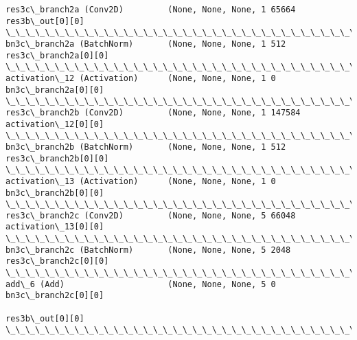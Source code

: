\documentclass[11pt]{article}
\begin{document}
\begin{Verbatim}[commandchars=\\\{\}]
res3c\_branch2a (Conv2D)         (None, None, None, 1 65664       res3b\_out[0][0]                  
\_\_\_\_\_\_\_\_\_\_\_\_\_\_\_\_\_\_\_\_\_\_\_\_\_\_\_\_\_\_\_\_\_\_\_\_\_\_\_\_\_\_\_\_\_\_\_\_\_\_\_\_\_\_\_\_\_\_\_\_\_\_\_\_\_\_\_\_\_\_\_\_\_\_\_\_\_\_\_\_\_\_\_\_\_\_\_\_\_\_\_\_\_\_\_\_\_\_
bn3c\_branch2a (BatchNorm)       (None, None, None, 1 512         res3c\_branch2a[0][0]             
\_\_\_\_\_\_\_\_\_\_\_\_\_\_\_\_\_\_\_\_\_\_\_\_\_\_\_\_\_\_\_\_\_\_\_\_\_\_\_\_\_\_\_\_\_\_\_\_\_\_\_\_\_\_\_\_\_\_\_\_\_\_\_\_\_\_\_\_\_\_\_\_\_\_\_\_\_\_\_\_\_\_\_\_\_\_\_\_\_\_\_\_\_\_\_\_\_\_
activation\_12 (Activation)      (None, None, None, 1 0           bn3c\_branch2a[0][0]              
\_\_\_\_\_\_\_\_\_\_\_\_\_\_\_\_\_\_\_\_\_\_\_\_\_\_\_\_\_\_\_\_\_\_\_\_\_\_\_\_\_\_\_\_\_\_\_\_\_\_\_\_\_\_\_\_\_\_\_\_\_\_\_\_\_\_\_\_\_\_\_\_\_\_\_\_\_\_\_\_\_\_\_\_\_\_\_\_\_\_\_\_\_\_\_\_\_\_
res3c\_branch2b (Conv2D)         (None, None, None, 1 147584      activation\_12[0][0]              
\_\_\_\_\_\_\_\_\_\_\_\_\_\_\_\_\_\_\_\_\_\_\_\_\_\_\_\_\_\_\_\_\_\_\_\_\_\_\_\_\_\_\_\_\_\_\_\_\_\_\_\_\_\_\_\_\_\_\_\_\_\_\_\_\_\_\_\_\_\_\_\_\_\_\_\_\_\_\_\_\_\_\_\_\_\_\_\_\_\_\_\_\_\_\_\_\_\_
bn3c\_branch2b (BatchNorm)       (None, None, None, 1 512         res3c\_branch2b[0][0]             
\_\_\_\_\_\_\_\_\_\_\_\_\_\_\_\_\_\_\_\_\_\_\_\_\_\_\_\_\_\_\_\_\_\_\_\_\_\_\_\_\_\_\_\_\_\_\_\_\_\_\_\_\_\_\_\_\_\_\_\_\_\_\_\_\_\_\_\_\_\_\_\_\_\_\_\_\_\_\_\_\_\_\_\_\_\_\_\_\_\_\_\_\_\_\_\_\_\_
activation\_13 (Activation)      (None, None, None, 1 0           bn3c\_branch2b[0][0]              
\_\_\_\_\_\_\_\_\_\_\_\_\_\_\_\_\_\_\_\_\_\_\_\_\_\_\_\_\_\_\_\_\_\_\_\_\_\_\_\_\_\_\_\_\_\_\_\_\_\_\_\_\_\_\_\_\_\_\_\_\_\_\_\_\_\_\_\_\_\_\_\_\_\_\_\_\_\_\_\_\_\_\_\_\_\_\_\_\_\_\_\_\_\_\_\_\_\_
res3c\_branch2c (Conv2D)         (None, None, None, 5 66048       activation\_13[0][0]              
\_\_\_\_\_\_\_\_\_\_\_\_\_\_\_\_\_\_\_\_\_\_\_\_\_\_\_\_\_\_\_\_\_\_\_\_\_\_\_\_\_\_\_\_\_\_\_\_\_\_\_\_\_\_\_\_\_\_\_\_\_\_\_\_\_\_\_\_\_\_\_\_\_\_\_\_\_\_\_\_\_\_\_\_\_\_\_\_\_\_\_\_\_\_\_\_\_\_
bn3c\_branch2c (BatchNorm)       (None, None, None, 5 2048        res3c\_branch2c[0][0]             
\_\_\_\_\_\_\_\_\_\_\_\_\_\_\_\_\_\_\_\_\_\_\_\_\_\_\_\_\_\_\_\_\_\_\_\_\_\_\_\_\_\_\_\_\_\_\_\_\_\_\_\_\_\_\_\_\_\_\_\_\_\_\_\_\_\_\_\_\_\_\_\_\_\_\_\_\_\_\_\_\_\_\_\_\_\_\_\_\_\_\_\_\_\_\_\_\_\_
add\_6 (Add)                     (None, None, None, 5 0           bn3c\_branch2c[0][0]              
                                                                 res3b\_out[0][0]                  
\_\_\_\_\_\_\_\_\_\_\_\_\_\_\_\_\_\_\_\_\_\_\_\_\_\_\_\_\_\_\_\_\_\_\_\_\_\_\_\_\_\_\_\_\_\_\_\_\_\_\_\_\_\_\_\_\_\_\_\_\_\_\_\_\_\_\_\_\_\_\_\_\_\_\_\_\_\_\_\_\_\_\_\_\_\_\_\_\_\_\_\_\_\_\_\_\_\_

\end{Verbatim}
\end{document}
